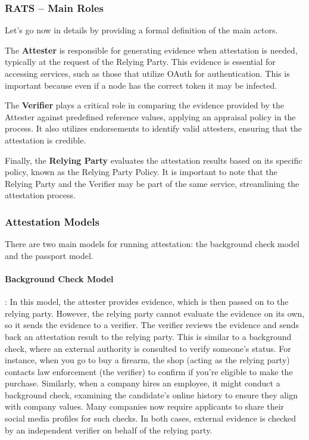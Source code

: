 \subsubsection{RATS – Main Roles}

Let's go now in details by providing a formal definition of the main
actors.

The \textbf{Attester} is responsible for generating evidence when
attestation is needed, typically at the request of the Relying Party.
This evidence is essential for accessing services, such as those that
utilize OAuth for authentication. This is important because even if a
node has the correct token it may be infected.

The \textbf{Verifier} plays a critical role in comparing the evidence
provided by the Attester against predefined reference values, applying
an appraisal policy in the process. It also utilizes endorsements to
identify valid attesters, ensuring that the attestation is credible.

Finally, the \textbf{Relying Party} evaluates the attestation results
based on its specific policy, known as the Relying Party Policy. It is
important to note that the Relying Party and the Verifier may be part
of the same service, streamlining the attestation process.

\subsubsection{Attestation Models}

There are two main models for running attestation: the background
check model and the passport model.

\paragraph{Background Check Model}: In this model, the attester
provides evidence, which is then passed on to the relying party.
However, the relying party cannot evaluate the evidence on its own, so
it sends the evidence to a verifier. The verifier reviews the evidence
and sends back an attestation result to the relying party. This is
similar to a background check, where an external authority is
consulted to verify someone’s status. For instance, when you go to buy
a firearm, the shop (acting as the relying party) contacts law
enforcement (the verifier) to confirm if you’re eligible to make the
purchase. Similarly, when a company hires an employee, it might
conduct a background check, examining the candidate’s online history
to ensure they align with company values. Many companies now require
applicants to share their social media profiles for such checks. In
both cases, external evidence is checked by an independent verifier on
behalf of the relying party.


